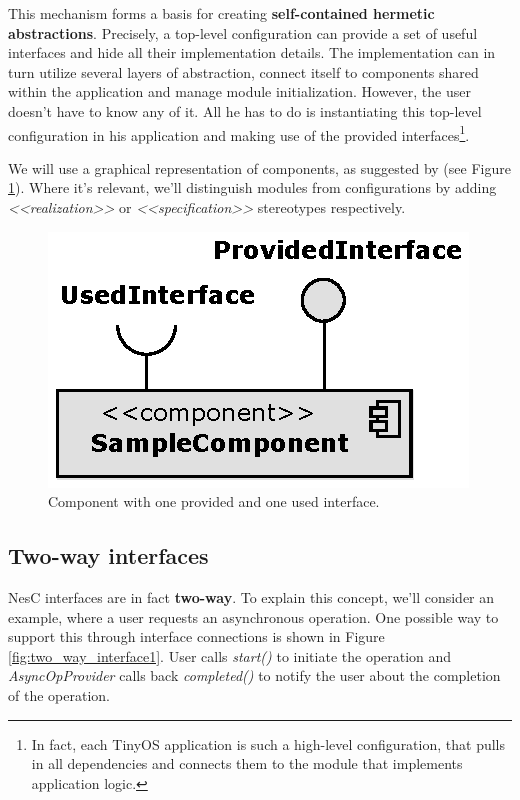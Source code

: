 This mechanism forms a basis for creating {\bf self-contained hermetic abstractions}. Precisely, a top-level configuration can provide a set of useful interfaces and hide all their implementation details. The implementation can in turn utilize several layers of abstraction, connect itself to components shared within the application and manage module initialization. However, the user doesn't have to know any of it. All he has to do is instantiating this top-level configuration in his application and making use of the provided interfaces\footnote{In fact, each TinyOS application is such a high-level configuration, that pulls in all dependencies and connects them to the module that implements application logic.}.

We will use a graphical representation of components, as suggested by \cite{Bachmaier} (see Figure \ref{fig:example_component}). Where it's relevant, we'll distinguish modules from configurations by adding \emph{<<realization>>} or \emph{<<specification>>} stereotypes respectively.

\begin{figure}[h]
  \centering
  \includegraphics{diagrams/example_component.eps}
  \caption{Component with one provided and one used interface.}
  \label{fig:example_component}
\end{figure}

\subsection{Two-way interfaces}

NesC interfaces are in fact {\bf two-way}. To explain this concept, we'll consider an example, where a user requests an asynchronous operation. One possible way to support this through interface connections is shown in Figure \ref{fig:two_way_interface1}. User calls \emph{start()} to initiate the operation and \emph{AsyncOpProvider} calls back \emph{completed()} to notify the user about the completion of the operation.

